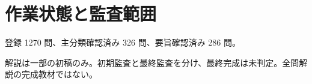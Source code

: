 \chapter{作業状態と監査範囲}
登録 1270 問、主分類確認済み 326 問、要旨確認済み 286 問。
\par 解説は一部の初稿のみ。初期監査と最終監査を分け、最終完成は未判定。全問解説の完成教材ではない。
